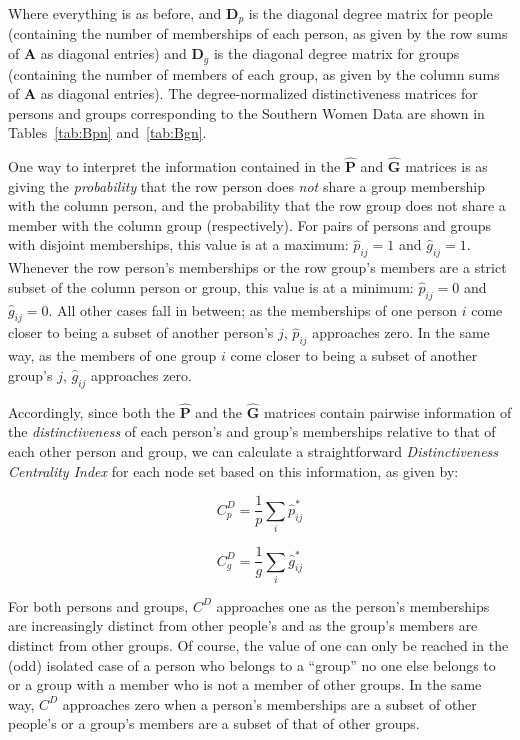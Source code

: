 \documentclass[a4paper,fleqn]{cas-sc}
\begin{document}
Where everything is as before, and $\textbf{D}_p$ is the diagonal degree matrix for people (containing the number of memberships of each person, as given by the row sums of $\mathbf{A}$ as diagonal entries) and $\textbf{D}_g$ is the diagonal degree matrix for groups (containing the number of members of each group, as given by the column sums of $\mathbf{A}$ as diagonal entries). The degree-normalized distinctiveness matrices for persons and groups corresponding to the Southern Women Data are shown in Tables~\ref{tab:Bpn} and~\ref{tab:Bgn}.




One way to interpret the information contained in the $\hat{\textbf{P}}$ and $\hat{\textbf{G}}$ matrices is as giving the \textit{probability} that the row person does \textit{not} share a group membership with the column person, and the probability that the row group does not share a member with the column group (respectively). For pairs of persons and groups with disjoint memberships, this value is at a maximum: $\hat{p}_{ij} = 1$ and $\hat{g}_{ij} = 1$. Whenever the row person's memberships or the row group's members are a strict subset of the column person or group, this value is at a minimum: $\hat{p}_{ij} = 0$ and $\hat{g}_{ij} = 0$. All other cases fall in between; as the memberships of one person $i$ come closer to being a subset of another person's $j$, $\hat{p}_{ij}$ approaches zero. In the same way, as the members of one group $i$ come closer to being a subset of another group's $j$, $\hat{g}_{ij}$ approaches zero. 

Accordingly, since both the $\hat{\textbf{P}}$ and the $\hat{\textbf{G}}$ matrices contain pairwise information of the \textit{distinctiveness} of each person's and group's memberships relative to that of each other person and group, we can calculate a straightforward \textit{Distinctiveness Centrality Index} for each node set based on this information, as given by:

\begin{equation}
    C^{D}_p = \frac{1}{p}\sum_i \hat{p}_{ij}^*
\end{equation}

\begin{equation}
     C^{D}_g = \frac{1}{g}\sum_i \hat{g}_{ij}^*
\end{equation}

For both persons and groups, $C^{D}$ approaches one as the person's memberships are increasingly distinct from other people's and as the group's members are distinct from other groups. Of course, the value of one can only be reached in the (odd) isolated case of a person who belongs to a ``group'' no one else belongs to or a group with a member who is not a member of other groups. In the same way, $C^{D}$ approaches zero when a person's memberships are a subset of other people's or a group's members are a subset of that of other groups. 
\end{document}
